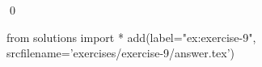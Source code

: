 
\begin{ex} 
  \label{ex:exercise-9}
  
  \qed
\end{ex} 
\begin{python0}
from solutions import *
add(label="ex:exercise-9",
    srcfilename='exercises/exercise-9/answer.tex') 
\end{python0}
